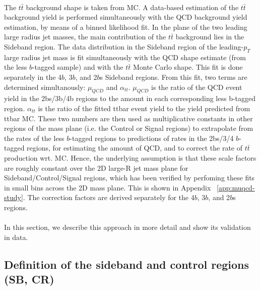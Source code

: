 \paragraph{}
The $t\bar{t}$ background shape is taken from MC. A data-based estimation of the $t\bar{t}$ background yield is performed simultaneously with the QCD background yield estimation, by means of a binned likelihood fit.
In the plane of the two leading large radius jet masses, the main contribution of the $t\bar{t}$ background lies in the Sideband region. The data distribution in the Sideband region of the leading-$p_{T}$ large radius jet mass is fit simultaneously with the QCD shape estimate (from the less $b$-tagged sample) and with the $t\bar{t}$ Monte Carlo shape. This fit is done separately in the 4$b$, 3$b$, and 2$b$s Sideband regions.
From this fit, two terms are determined simultanously: $\mu_{QCD}$ and $\alpha_{tt}$. $\mu_{QCD}$ is the ratio of the QCD event yield in the 2bs/3b/4b regions to the amount in each corresponding less b-tagged region. $\alpha_{tt}$ is the ratio of the fitted ttbar event yield to the yield predicted from ttbar MC.
These two numbers are then used as multiplicative constants in other regions of the mass plane (i.e. the Control or Signal regions) to extrapolate from the rates of the less $b$-tagged regions to predictions of rates in the 2bs/3/4 $b$-tagged regions, for estimating the amount of QCD, and to correct the rate of $t\bar{t}$ production wrt. MC. Hence, the underlying assumption is that these scale factors are roughly constant over the 2D large-R jet mass plane for Sideband/Control/Signal regions, which has been verified by perfoming these fits in small bins across the 2D mass plane. This is shown in Appendix ~\ref{app:muqcd-study}. The correction factors are derived separately for the 4$b$, 3$b$, and 2$b$s regions.

\paragraph{}
In this section, we describe this approach in more detail and show its validation in data.


\subsection{Definition of the sideband and control regions (SB, CR)}
\label{sec:boosted-SBCR}

\paragraph{}

